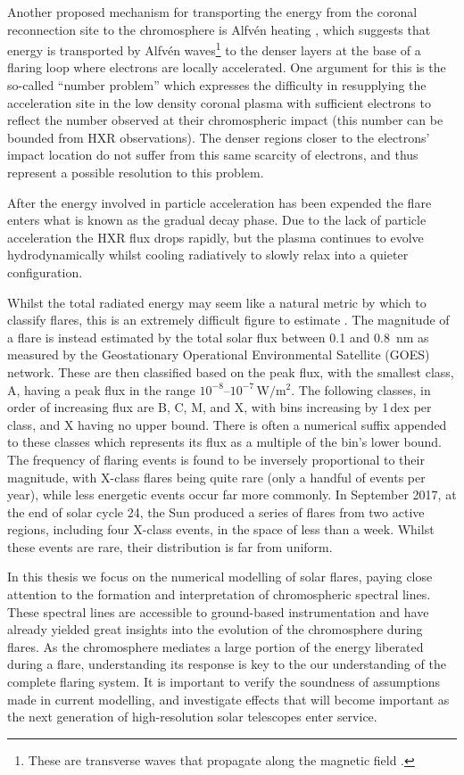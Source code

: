 Another proposed mechanism for transporting the energy from the coronal reconnection site to the chromosphere is Alfvén heating \citep{Emslie1982, Fletcher2007}, which suggests that energy is transported by Alfvén waves\footnote{These  are transverse waves that propagate along the magnetic field \citep[e.g. ][]{TandbergHanssen1988}.} to the denser layers at the base of a flaring loop where electrons are locally accelerated.
One argument for this is the so-called ``number problem'' which expresses the difficulty in resupplying the acceleration site in the low density coronal plasma with sufficient electrons to reflect the number observed at their chromospheric impact (this number can be bounded from HXR observations).
The denser regions closer to the electrons' impact location do not suffer from this same scarcity of electrons, and thus represent a possible resolution to this problem.

After the energy involved in particle acceleration has been expended the flare enters what is known as the gradual decay phase.
Due to the lack of particle acceleration the HXR flux drops rapidly, but the plasma continues to evolve hydrodynamically whilst cooling radiatively to slowly relax into a quieter configuration.

Whilst the total radiated energy may seem like a natural metric by which to classify flares, this is an extremely difficult figure to estimate \citep[e.g.][]{Milligan2014}.
The magnitude of a flare is instead estimated by the total solar flux between 0.1 and \SI{0.8}{\nano\metre} as measured by the Geostationary Operational Environmental Satellite (GOES) network.
These are then classified based on the peak flux, with the smallest class, A, having a peak flux in the range $10^{-8}$--$10^{-7}\,\si{\watt\per\square\m}$.
The following classes, in order of increasing flux are B, C, M, and X, with bins increasing by 1\,dex per class, and X having no upper bound.
There is often a numerical suffix appended to these classes which represents its flux as a multiple of the bin's lower bound.
The frequency of flaring events is found to be inversely proportional to their magnitude, with X-class flares being quite rare (only a handful of events per year), while less energetic events occur far more commonly.
In September 2017, at the end of solar cycle 24, the Sun produced a series of flares from two active regions, including four X-class events, in the space of less than a week.
Whilst these events are rare, their distribution is far from uniform.

In this thesis we focus on the numerical modelling of solar flares, paying close attention to the formation and interpretation of chromospheric spectral lines.
These spectral lines are accessible to ground-based instrumentation and have already yielded great insights into the evolution of the chromosphere during flares.
As the chromosphere mediates a large portion of the energy liberated during a flare, understanding its response is key to the our understanding of the complete flaring system.
It is important to verify the soundness of assumptions made in current modelling, and investigate effects that will become important as the next generation of high-resolution solar telescopes enter service.

